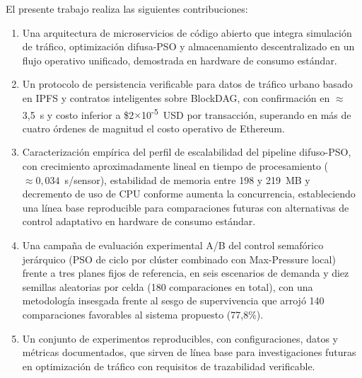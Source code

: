 El presente trabajo realiza las siguientes contribuciones:

\begin{enumerate}
    \item Una arquitectura de microservicios de código abierto que integra simulación de
          tráfico, optimización difusa-PSO y almacenamiento descentralizado en un flujo
          operativo unificado, demostrada en hardware de consumo estándar.

    \item Un protocolo de persistencia verificable para datos de tráfico urbano basado en
          IPFS y contratos inteligentes sobre BlockDAG, con confirmación en $\approx$3,5~s y
          costo inferior a \$2$\times$10\textsuperscript{-5}~USD por transacción,
          superando en más de cuatro órdenes de magnitud el costo operativo de Ethereum.

    \item Caracterización empírica del perfil de escalabilidad del pipeline difuso-PSO,
          con crecimiento aproximadamente lineal en tiempo de procesamiento
          ($\approx 0{,}034$~s/sensor), estabilidad de memoria entre 198 y 219~MB y
          decremento de uso de CPU conforme aumenta la concurrencia, estableciendo una
          línea base reproducible para comparaciones futuras con alternativas de control
          adaptativo en hardware de consumo estándar.

    \item Una campaña de evaluación experimental A/B del control semafórico jerárquico
          (PSO de ciclo por clúster combinado con Max-Pressure local) frente a tres planes
          fijos de referencia, en seis escenarios de demanda y diez semillas aleatorias por
          celda (180 comparaciones en total), con una metodología insesgada frente al sesgo
          de supervivencia que arrojó 140 comparaciones favorables al sistema propuesto
          (77,8\%).

    \item Un conjunto de experimentos reproducibles, con configuraciones, datos y métricas
          documentados, que sirven de línea base para investigaciones futuras en optimización
          de tráfico con requisitos de trazabilidad verificable.
\end{enumerate}


